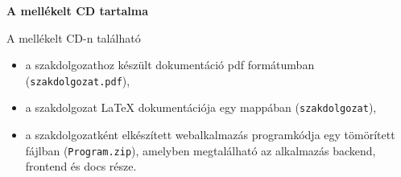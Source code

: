 \label{Chap:CD}
\pagestyle{empty}

\noindent \textbf{\Large A mellékelt CD tartalma}

\vskip 1cm

A mellékelt CD-n található

\begin{itemize}
\item a szakdolgozathoz készült dokumentáció pdf formátumban (\texttt{szakdolgozat.pdf}), 
\item a szakdolgozat LaTeX dokumentációja egy mappában (\texttt{szakdolgozat}),
\item a szakdolgozatként elkészített webalkalmazás programkódja egy tömörített fájlban (\texttt{Program.zip}), amelyben megtalálható az alkalmazás backend, frontend és docs része.
\end{itemize}